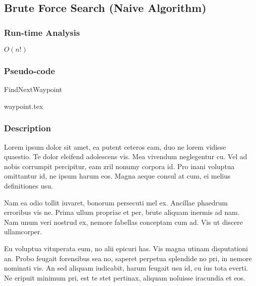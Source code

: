 \subsection{Brute Force Search (Naive Algorithm)}
\subsubsection{Run-time Analysis} 
$O(n!)$
\subsubsection{Pseudo-code}

\begin{algorithm}[H]
\caption{FindNextWaypoint}
\label{alg:waypointAlgo}
\begin{algorithmic}[1]
{waypoint.tex}
\end{algorithmic}
\end{algorithm}

\subsubsection{Description}
Lorem ipsum dolor sit amet, ea putent ceteros eam, duo ne lorem vidisse quaestio. Te dolor eleifend adolescens vis. Mea vivendum neglegentur cu. Vel ad nobis corrumpit percipitur, eam zril nonumy corpora id. Pro inani voluptua omittantur id, ne ipsum harum eos. Magna aeque consul at cum, ei melius definitiones usu.

Nam ea odio tollit iuvaret, bonorum persecuti mel ex. Ancillae phaedrum erroribus vis ne. Prima ullum propriae et per, brute aliquam inermis ad nam. Nam unum veri nostrud ex, nemore fabellas conceptam cum ad. Vis ut discere ullamcorper.

Eu voluptua vituperata eum, no alii epicuri has. Vis magna utinam disputationi an. Probo feugait forensibus sea no, saperet perpetua splendide no pri, in nemore nominati vis. An sed aliquam iudicabit, harum feugait usu id, cu ius tota everti. Ne eripuit minimum pri, est te stet pertinax, aliquam noluisse iracundia et eos.